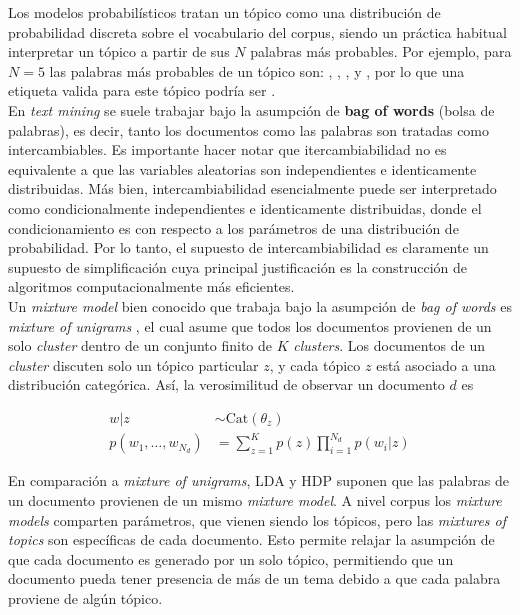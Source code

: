 Los modelos probabilísticos tratan un tópico como una distribución de probabilidad discreta sobre el vocabulario del corpus, siendo un práctica habitual interpretar un tópico a partir de sus $N$ palabras más probables. Por ejemplo, para $N=5$ las palabras más probables de un tópico son: , , ,  y , por lo que una etiqueta valida para este tópico podría ser .\\ 

En \textit{text mining} se suele trabajar bajo la asumpción de \textbf{bag of words} (bolsa de palabras), es decir, tanto los documentos como las palabras son tratadas como intercambiables. Es importante hacer notar que itercambiabilidad no es equivalente a que las variables aleatorias son independientes e identicamente distribuidas. Más bien, intercambiabilidad esencialmente puede ser interpretado como condicionalmente independientes e identicamente distribuidas, donde el condicionamiento es con respecto a los parámetros de una distribución de probabilidad. Por lo tanto, el supuesto de intercambiabilidad es claramente un supuesto de simplificación cuya principal justificación es la construcción de algoritmos computacionalmente más eficientes.\\

Un \textit{mixture model} bien conocido que trabaja bajo la asumpción de \textit{bag of words} es \textit{mixture of unigrams} \citep{nigam2000text}, el cual asume que todos los documentos provienen de un solo \textit{cluster} dentro de un conjunto finito de $K$ \textit{clusters}. Los documentos de un \textit{cluster} discuten solo un tópico particular $z$, y cada tópico $z$ está asociado a una distribución categórica. Así, la verosimilitud de observar un documento $d$ es

\begin{align}
    w|z &\sim \text{Cat}(\theta_{z})\\
    p(w_{1}, \ldots, w_{N_{d}}) &= \sum_{z=1}^{K}p(z)\prod_{i=1}^{N_{d}}p(w_{i}|z)
\end{align}

En comparación a \textit{mixture of unigrams}, LDA y HDP suponen que las palabras de un documento provienen de un mismo \textit{mixture model}. A nivel corpus los \textit{mixture models} comparten parámetros, que vienen siendo los tópicos, pero las \textit{mixtures of topics} son específicas de cada documento. Esto permite relajar la asumpción de que cada documento es generado por un solo tópico, permitiendo que un documento pueda tener presencia de más de un tema debido a que cada palabra proviene de algún tópico.\\

